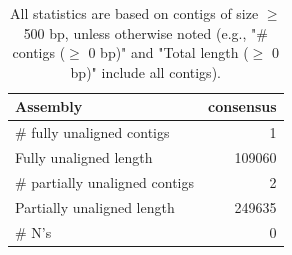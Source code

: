 \documentclass[12pt,a4paper]{article}
\begin{document}
\begin{table}[ht]
\begin{center}
\caption{All statistics are based on contigs of size $\geq$ 500 bp, unless otherwise noted (e.g., "\# contigs ($\geq$ 0 bp)" and "Total length ($\geq$ 0 bp)" include all contigs).}
\begin{tabular}{|l*{1}{|r}|}
\hline
Assembly & consensus \\ \hline
\# fully unaligned contigs & 1 \\ \hline
Fully unaligned length & 109060 \\ \hline
\# partially unaligned contigs & 2 \\ \hline
Partially unaligned length & 249635 \\ \hline
\# N's & 0 \\ \hline
\end{tabular}
\end{center}
\end{table}
\end{document}
